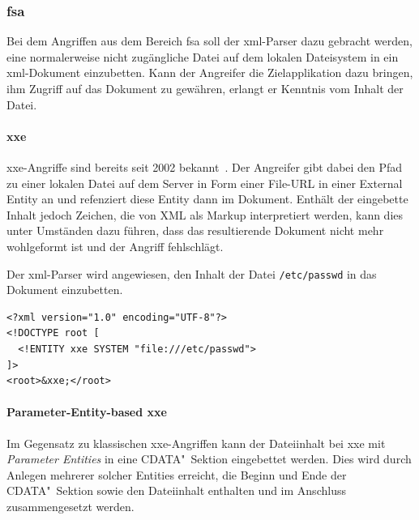 \subsubsection{\acrlong{fsa}}
\label{sec:xmlattacks-fsa}
Bei dem Angriffen aus dem Bereich \acrlong{fsa} soll der \acrshort{xml}-Parser dazu gebracht werden, eine normalerweise nicht zugängliche Datei auf dem lokalen Dateisystem in ein \acrshort{xml}-Dokument einzubetten. Kann der Angreifer die Zielapplikation dazu bringen, ihm Zugriff auf das Dokument zu gewähren, erlangt er Kenntnis vom Inhalt der Datei.

\paragraph{\acrfull{xxe}}
\acrshort{xxe}-Angriffe sind bereits seit 2002 bekannt~\cite{steuck2002xxe}. Der Angreifer gibt dabei den Pfad zu einer lokalen Datei auf dem Server in Form einer File-URL in einer External Entity an und refenziert diese Entity dann im Dokument. Enthält der eingebette Inhalt jedoch Zeichen, die von XML als Markup interpretiert werden, kann dies unter Umständen dazu führen, dass das resultierende Dokument nicht mehr wohlgeformt ist und der Angriff fehlschlägt.~\cite[Abschnitt 5.1]{spaeth2016sok}

\begin{example} Der \acrshort{xml}-Parser wird angewiesen, den Inhalt der Datei \texttt{/etc/passwd} in das Dokument einzubetten.
    \begin{verbatim}
<?xml version="1.0" encoding="UTF-8"?>
<!DOCTYPE root [
  <!ENTITY xxe SYSTEM "file:///etc/passwd">
]>
<root>&xxe;</root>
    \end{verbatim}
\end{example}

\paragraph{Parameter-Entity-based \acrfull{xxe}} Im Gegensatz zu klassischen \acrshort{xxe}-Angriffen kann der Dateiinhalt bei \gls{xxe} mit \emph{Parameter Entities} in eine CDATA"~Sektion eingebettet werden. Dies wird durch Anlegen mehrerer solcher Entities erreicht, die Beginn und Ende der CDATA"~Sektion sowie den Dateiinhalt enthalten und im Anschluss zusammengesetzt werden.~\cite[S.~10]{morgan2014xml}

